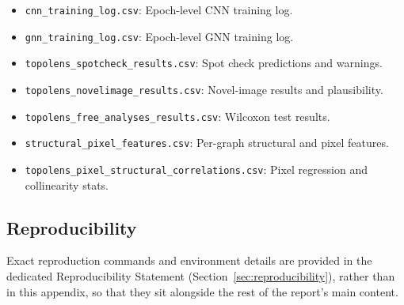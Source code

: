 \documentclass[11pt,letterpaper]{article}
\numberwithin{equation}{section}
\numberwithin{figure}{section}
\numberwithin{table}{section}
\begin{document}
\begin{itemize}
\begin{itemize}
        \item \texttt{cnn\_training\_log.csv}: Epoch-level CNN training log.
        \item \texttt{gnn\_training\_log.csv}: Epoch-level GNN training log.
        \item \texttt{topolens\_spotcheck\_results.csv}: Spot check predictions and warnings.
        \item \texttt{topolens\_novelimage\_results.csv}: Novel-image results and plausibility.
        \item \texttt{topolens\_free\_analyses\_results.csv}: Wilcoxon test results.
        \item \texttt{structural\_pixel\_features.csv}: Per-graph structural and pixel features.
        \item \texttt{topolens\_pixel\_structural\_correlations.csv}: Pixel regression and collinearity stats.
    \end{itemize}
\end{itemize}

\subsection*{Reproducibility}
Exact reproduction commands and environment details are provided in the dedicated Reproducibility Statement (Section~\ref{sec:reproducibility}), rather than in this appendix, so that they sit alongside the rest of the report's main content.
\end{document}
